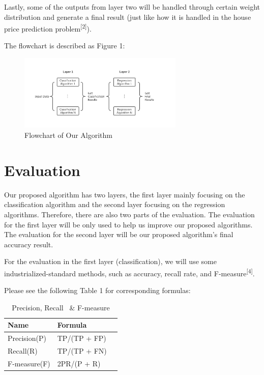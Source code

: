 \documentclass{article}
\begin{document}
Lastly, some of the outputs from layer two will be handled through certain weight distribution and generate a final result (just like how it is handled in the house price prediction problem\textsuperscript{[2]}).

The flowchart is described as Figure 1: 

\begin{figure}[H] 
\centering 
\includegraphics[width=0.7\textwidth]{layers} 
\caption{Flowchart of Our Algorithm} 
\label{Flowchart of Our Algorithm} 
\end{figure}

\section{Evaluation}
Our proposed algorithm has two layers, the first layer mainly focusing on the classification algorithm and the second layer focusing on the regression algorithms. Therefore, there are also two parts of the evaluation. The evaluation for the first layer will be only used to help us improve our proposed algorithms. The evaluation for the second layer will be our proposed algorithm’s final accuracy result. 

For the evaluation in the first layer (classification), we will use some industrialized-standard methods, such as accuracy, recall rate, and F-measure\textsuperscript{[4]}. 

Please see the following Table 1 for corresponding formulas:
\begin{table}[H]
  \caption{Precision, Recall \ \& F-measure}
  \label{Precision, Recall and F-measure}
  \centering
  \begin{tabular}{lll}
    \toprule
    \cmidrule(r){1-2}
    Name     & Formula\\
    \midrule
    Precision(P) & TP/(TP + FP)     \\
    Recall(R)     & TP/(TP + FN) \\
    F-measure(F)     & 2PR/(P + R)\\
    \bottomrule
  \end{tabular}
\end{table}
\end{document}
